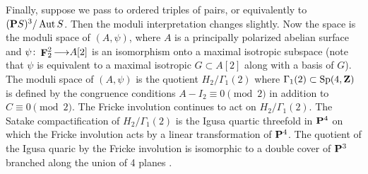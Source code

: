 \documentclass[11pt,reqno]{amsart}
\theoremstyle{plain}
\theoremstyle{definition}
\theoremstyle{remark}
\numberwithin{equation}{section}
\DeclareMathOperator{\F}{\mathbf F}
\renewcommand{\to}{{\longrightarrow}}
\numberwithin{equation}{section}
\begin{document}
\begin{remark}
  Finally, suppose we pass to ordered triples of pairs, or equivalently to $(\P S)^3 / \Aut S$.
  Then the moduli interpretation changes slightly.
  Now the space is the moduli space of $(A, \psi)$, where $A$ is a principally polarized abelian surface and $\psi \from \F_2^2 \to A[2]$ is an isomorphism onto a maximal isotropic subspace (note that $\psi$ is equivalent to a maximal isotropic $G \subset A[2]$ along with a basis of $G$).
  The moduli space of $(A, \psi)$ is the quotient $H_2 / \Gamma_1(2)$ where $\Gamma_1(2) \subset \operatorname{Sp}(4, \Z)$ is defined by the congruence conditions $A - I_2 \equiv 0 \pmod 2$ in addition to $C \equiv 0 \pmod 2$.
  The Fricke involution continues to act on $H_2 / \Gamma_1(2)$.
  The Satake compactification of $H_2 / \Gamma_1(2)$ is the Igusa quartic threefold in $\P^4$ on which the Fricke involution acts by a linear transformation of $\P^4$.
  The quotient of the Igusa quaric by the Fricke involution is isomorphic to a double cover of $\P^3$ branched along the union of 4 planes  \cite[Theorem~2]{muk:12}.
\end{remark}
\end{document}
